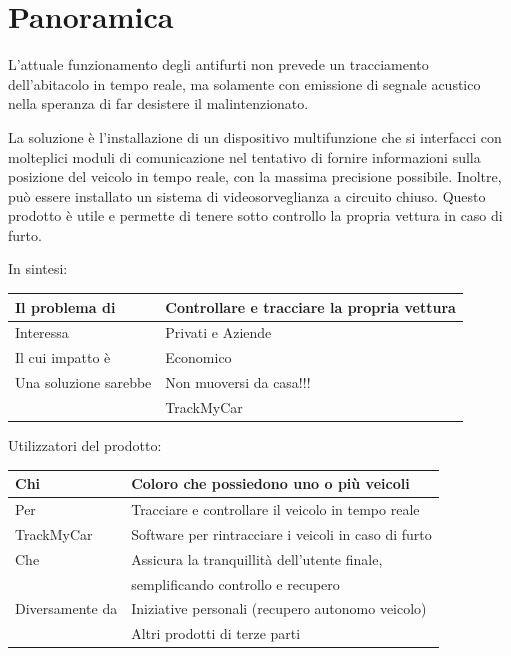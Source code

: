 \documentclass[a4paper,12pt]{article}
\begin{document}
\pagebreak

\section{Panoramica}
L'attuale funzionamento degli antifurti non prevede un tracciamento dell'abitacolo in tempo reale, ma solamente con emissione di segnale acustico nella speranza di far desistere il malintenzionato. 

La soluzione è l'installazione di un dispositivo multifunzione che si interfacci con molteplici moduli di comunicazione nel tentativo di fornire informazioni sulla posizione del veicolo in tempo reale, con la massima precisione possibile. Inoltre, può essere installato un sistema di videosorveglianza a circuito chiuso.
Questo prodotto è utile e permette di tenere sotto controllo la propria vettura in caso di furto.

\begin{table}[h]
In sintesi:
\begin{center}
\begin{tabular}{ p{4 cm}  p{9 cm} }
\hline	
Il problema di & Controllare e tracciare la propria vettura \\ \hline
Interessa & Privati e Aziende \\ 
Il cui impatto è & Economico \\ 
Una soluzione sarebbe & Non muoversi da casa!!!  \\ 
& TrackMyCar \\ \hline
\end{tabular}
\end{center}
\end{table}

\begin{table}[h]
Utilizzatori del prodotto:
\begin{center}
\begin{tabular}{ p{4 cm}  p{9 cm} }
\hline	
Chi & Coloro che possiedono uno o più veicoli \\ \hline
Per & Tracciare e controllare il veicolo in tempo reale \\ 
TrackMyCar & Software per rintracciare i veicoli in caso di furto \\ 
Che & Assicura la tranquillità dell'utente finale, \\
&semplificando controllo e recupero \\ 
Diversamente da & Iniziative personali (recupero autonomo veicolo) \\ 
&Altri prodotti di terze parti \\ \hline
\end{tabular}
\end{center}
\end{table}
\end{document}
